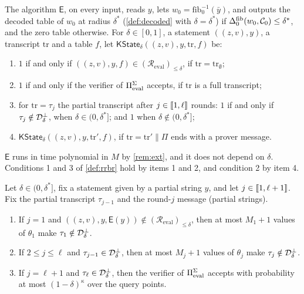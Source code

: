 \begin{definition}\label{def:kstate}
The algorithm $\mathsf{E}$, on every input, reads $y$, lets $w_0 = \mathrm{fib}_0^{-1}(\bar y)$, and outputs the decoded table of $w_0$ at radius $\delta^*$ (\cref{def:decoded} with $\delta = \delta^*$) if $\Delta^{\mathrm{fib}}_0(w_0, \mathcal{C}_0) \le \delta^*$, and the zero table otherwise.
For $\delta \in [0,1]$, a statement $((z,v), y)$, a transcript $\mathrm{tr}$ and a table $f$, let $\mathsf{KState}_\delta((z,v), y, \mathrm{tr}, f)$ be:
\begin{enumerate}
  \item $1$ if and only if $((z,v), y, f) \in (\mathcal{R}_{\mathrm{eval}})_{\le\delta}$, if $\mathrm{tr} = \mathrm{tr}_\emptyset$;
  \item $1$ if and only if the verifier of $\Pi_{\mathrm{eval}}^{\Sigma}$ accepts, if $\mathrm{tr}$ is a full transcript;
  \item for $\mathrm{tr} = \tau_j$ the partial transcript after $j \in \llbracket 1, \ell \rrbracket$ rounds: $1$ if and only if $\tau_j \notin \mathcal{D}^{\bot}_\delta$, when $\delta \in (0, \delta^*]$; and $1$ when $\delta \notin (0, \delta^*]$;
  \item $\mathsf{KState}_\delta((z,v), y, \mathrm{tr}', f)$, if $\mathrm{tr} = \mathrm{tr}' \| \Pi$ ends with a prover message.
\end{enumerate}
\end{definition}

$\mathsf{E}$ runs in time polynomial in $M$ by \cref{rem:ext}, and it does not depend on $\delta$.
Conditions 1 and 3 of \cref{def:rrbr} hold by items 1 and 2, and condition 2 by item 4.

\begin{lemma}\label{lem:rbr-erasures}
Let $\delta \in (0, \delta^*]$, fix a statement given by a partial string $y$, and let $j \in \llbracket 1, \ell+1 \rrbracket$.
Fix the partial transcript $\tau_{j-1}$ and the round-$j$ message (partial strings).
\begin{enumerate}
  \item If $j = 1$ and $((z,v), y, \mathsf{E}(y)) \notin (\mathcal{R}_{\mathrm{eval}})_{\le\delta}$, then at most $M_1 + 1$ values of $\theta_1$ make $\tau_1 \notin \mathcal{D}^{\bot}_\delta$.
  \item If $2 \le j \le \ell$ and $\tau_{j-1} \in \mathcal{D}^{\bot}_\delta$, then at most $M_j + 1$ values of $\theta_j$ make $\tau_j \notin \mathcal{D}^{\bot}_\delta$.
  \item If $j = \ell+1$ and $\tau_\ell \in \mathcal{D}^{\bot}_\delta$, then the verifier of $\Pi_{\mathrm{eval}}^{\Sigma}$ accepts with probability at most $(1-\delta)^{\kappa}$ over the query points.
\end{enumerate}
\end{lemma}

